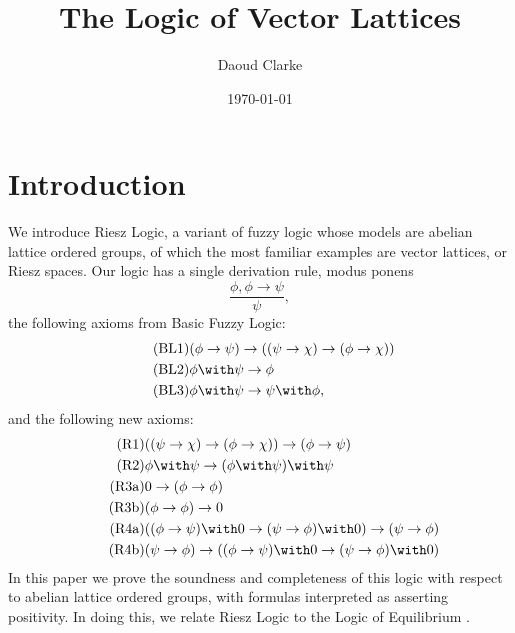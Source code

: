 \documentclass[preprint,leqno]{elsarticle}
\author{Daoud Clarke}
\date{\today}
\title{The Logic of Vector Lattices}
\begin{document}
\maketitle


\section{Introduction}

We introduce Riesz Logic, a variant of fuzzy logic whose models are
abelian lattice ordered groups, of which the most familiar examples
are vector lattices, or Riesz spaces.
%
%
%
%
%
Our logic has a single derivation rule, modus ponens
\begin{equation}\tag{MP}
\frac{\phi, \phi \rightarrow \psi}{\psi},
\end{equation}
the following axioms from Basic Fuzzy Logic:
\begin{align}
  \tag{BL1} &(\phi \rightarrow \psi) \rightarrow ((\psi \rightarrow \chi)
  \rightarrow (\phi \rightarrow \chi))\\
  \tag{BL2} &\phi \with \psi \rightarrow \phi\\
  \tag{BL3} &\phi \with \psi \rightarrow \psi \with \phi,
\end{align}
and the following new axioms:
\begin{align}
  \tag{R1} &((\psi \rightarrow \chi) \rightarrow (\phi \rightarrow
  \chi)) \rightarrow (\phi \rightarrow \psi)\\
  \tag{R2} &\phi \with \psi \rightarrow (\phi \with \psi) \with \psi\\
  \tag{R3a} &0 \rightarrow (\phi \rightarrow \phi)\\
  \tag{R3b} &(\phi \rightarrow\phi) \rightarrow 0\\
  \tag{R4a} &((\phi \rightarrow \psi)\with 0 \rightarrow (\psi \rightarrow \phi) \with 0) \rightarrow (\psi \rightarrow \phi)\\
  \tag{R4b} & (\psi \rightarrow \phi) \rightarrow ((\phi \rightarrow \psi)\with 0 \rightarrow (\psi \rightarrow \phi) \with 0)
\end{align}
In this paper we prove the soundness and completeness of this logic
with respect to abelian lattice ordered groups, with formulas
interpreted as asserting positivity. In doing this, we relate Riesz
Logic to the Logic of Equilibrium \cite{Galli:04}.
\end{document}
